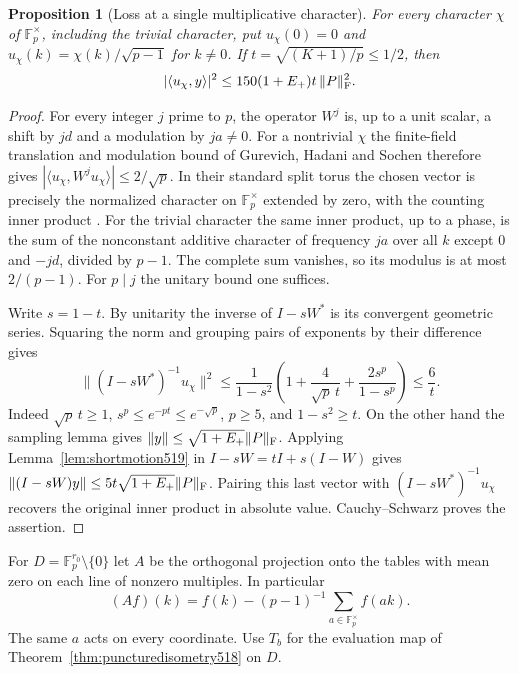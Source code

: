 \documentclass[a4paper,11pt]{article}
\newtheorem{proposition}{Proposition}[section]
\theoremstyle{definition}
\theoremstyle{remark}
\numberwithin{equation}{section}
\begin{document}
\begin{proposition}[Loss at a single multiplicative character]\leavevmode
\label{prop:mellinloss519}
For every character \(\chi\) of \(\mathbb F_p^\times\), including the
trivial character, put \(u_\chi(0)=0\) and
\(u_\chi(k)=\chi(k)/\sqrt{p-1}\) for \(k\ne0\). If
\(t=\sqrt{(K+1)/p}\le1/2\), then
\[
 |\langle u_\chi,y\rangle|^2
       \le 150(1+E_+)t\,\|P\|_{\rm F}^2 .
\]
\end{proposition}
\begin{proof}
For every integer \(j\) prime to \(p\), the operator \(W^j\) is,
up to a unit scalar, a shift by \(jd\) and a modulation by
\(ja\ne0\). For a nontrivial \(\chi\) the finite-field
translation and modulation bound of Gurevich, Hadani and Sochen
therefore gives \(|\langle u_\chi,W^j u_\chi\rangle|\le2/\sqrt p\).
In their standard split torus the chosen vector is precisely the
normalized character on \(\mathbb F_p^\times\) extended by zero,
with the counting inner product \cite[\S I-B and (I.1)]{XXVI-XX-oscillator519}.
For the trivial character the same inner product, up to a phase,
is the sum of the nonconstant additive character of frequency \(ja\)
over all \(k\) except \(0\) and \(-jd\), divided by \(p-1\).
The complete sum vanishes, so its modulus is at most \(2/(p-1)\).
For \(p\mid j\) the unitary bound one suffices.

Write \(s=1-t\). By unitarity the inverse of \(I-sW^*\) is its
convergent geometric series. Squaring the norm and grouping pairs
of exponents by their difference gives
\[
 \|(I-sW^*)^{-1}u_\chi\|^2
 \le \frac{1}{1-s^2}
     \left(1+\frac{4}{\sqrt p\,t}
              +\frac{2s^p}{1-s^p}\right)\le\frac6t .
\]
Indeed \(\sqrt p\,t\ge1\), \(s^p\le e^{-pt}\le e^{-\sqrt p}\),
\(p\ge5\), and \(1-s^2\ge t\). On the other hand the sampling
lemma gives \(\|y\|\le\sqrt{1+E_+}\|P\|_{\rm F}\). Applying
Lemma~\ref{lem:shortmotion519} in
\(I-sW=tI+s(I-W)\) gives
\(\|(I-sW)y\|\le5t\sqrt{1+E_+}\|P\|_{\rm F}\).
Pairing this last vector with \((I-sW^*)^{-1}u_\chi\) recovers
the original inner product in absolute value. Cauchy--Schwarz
proves the assertion.
\end{proof}

For \(D=\mathbb F_p^{r_0}\setminus\{0\}\) let \(A\) be the
orthogonal projection onto the tables with mean zero on each
line of nonzero multiples. In particular
\[
 (Af)(k)=f(k)-(p-1)^{-1}\sum_{a\in\mathbb F_p^\times}f(ak).
\]
The same \(a\) acts on every coordinate. Use \(T_b\) for the
evaluation map of Theorem~\ref{thm:puncturedisometry518} on \(D\).
\end{document}
